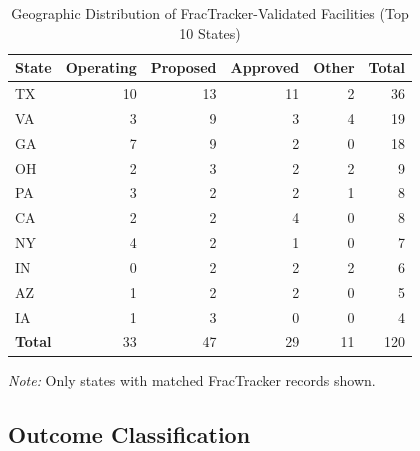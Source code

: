 \documentclass[5p,12pt]{elsarticle}
\begin{document}
\begin{table}[t]
\centering
\caption{Geographic Distribution of FracTracker-Validated Facilities (Top 10 States)}
\label{tab:geo_distribution}
\footnotesize
\begin{tabular}{lrrrrr}
\toprule
\textbf{State} & \textbf{Operating} & \textbf{Proposed} & \textbf{Approved} & \textbf{Other} & \textbf{Total} \\
\midrule
TX & 10 & 13 & 11 & 2 & 36 \\
VA & 3 & 9 & 3 & 4 & 19 \\
GA & 7 & 9 & 2 & 0 & 18 \\
OH & 2 & 3 & 2 & 2 & 9 \\
PA & 3 & 2 & 2 & 1 & 8 \\
CA & 2 & 2 & 4 & 0 & 8 \\
NY & 4 & 2 & 1 & 0 & 7 \\
IN & 0 & 2 & 2 & 2 & 6 \\
AZ & 1 & 2 & 2 & 0 & 5 \\
IA & 1 & 3 & 0 & 0 & 4 \\
\midrule
\textbf{Total} & 33 & 47 & 29 & 11 & 120 \\
\bottomrule
\end{tabular}
\footnotesize \textit{Note:} Only states with matched FracTracker records shown.
\end{table}

\subsection{Outcome Classification}
\end{document}
